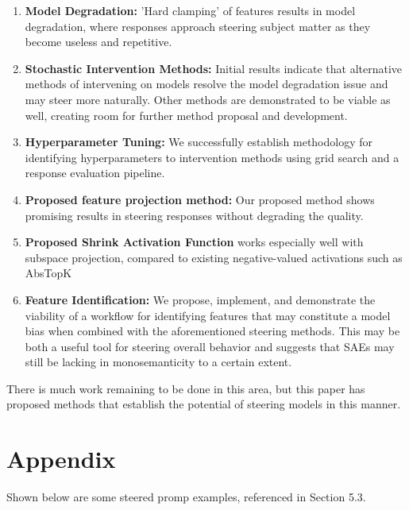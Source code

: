\documentclass{article}
\begin{document}
\begin{enumerate}
    \item \textbf{Model Degradation:} 'Hard clamping' of features results in model degradation, where responses approach steering subject matter as they become useless and repetitive.
    \item \textbf{Stochastic Intervention Methods:} Initial results indicate that alternative methods of intervening on models resolve the model degradation issue and may steer more naturally. Other methods are demonstrated to be viable as well, creating room for further method proposal and development.
    \item \textbf{Hyperparameter Tuning:} We successfully establish methodology for identifying hyperparameters to intervention methods using grid search and a response evaluation pipeline.
    \item \textbf{Proposed feature projection method:} Our proposed method shows promising results in steering responses without degrading the quality.
    \item \textbf{Proposed Shrink Activation Function} works especially well with subspace projection, compared to existing negative-valued activations such as AbsTopK\cite{abstopk}

    \item \textbf{Feature Identification:} We propose, implement, and demonstrate the viability of a workflow for identifying features that may constitute a model bias when combined with the aforementioned steering methods. This may be both a useful tool for steering overall behavior and suggests that SAEs may still be lacking in monosemanticity to a certain extent.
\end{enumerate}

There is much work remaining to be done in this area, but this paper has proposed methods that establish the potential of steering models in this manner.



\appendix
\section{Appendix}
Shown below are some steered promp examples, referenced in Section 5.3.
\end{document}
